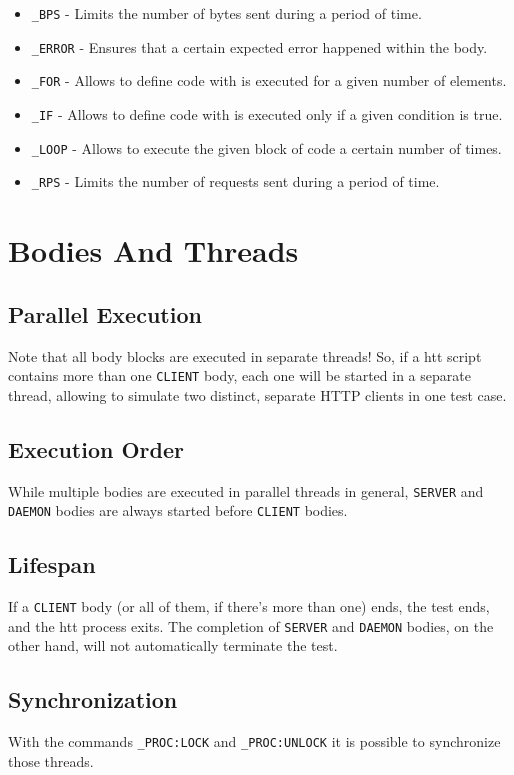 \begin{itemize}
\item \texttt{\_BPS} - Limits the number of bytes sent during a period of time.
\item \texttt{\_ERROR} - Ensures that a certain expected error happened within the body.
\item \texttt{\_FOR} - Allows to define code with is executed for a given number of elements.
\item \texttt{\_IF} - Allows to define code with is executed only if a given condition is true.
\item \texttt{\_LOOP} - Allows to execute the given block of code a certain number of times.
\item \texttt{\_RPS} - Limits the number of requests sent during a period of time.
\end{itemize}


\newpage 
\section{Bodies And Threads}

\subsection{Parallel Execution}
Note that all body blocks are executed in separate threads! So, if a htt 
script contains more than one \texttt{CLIENT} body, each one will be started in a 
separate thread, allowing to simulate two distinct, separate HTTP clients in 
one test case.

\subsection{Execution Order}
While multiple bodies are executed in parallel threads in general, \texttt{SERVER}
and \texttt{DAEMON} bodies are always started before \texttt{CLIENT} bodies.

\subsection{Lifespan}
If a \texttt{CLIENT} body (or all of them, if there's more than one) ends, 
the test ends, and the htt process exits. The completion of \texttt{SERVER} 
and \texttt{DAEMON} bodies, on the other hand, will not automatically terminate 
the test.

\subsection{Synchronization}
With the commands \texttt{\_PROC:LOCK} and \texttt{\_PROC:UNLOCK} it is possible to
synchronize those threads. 


